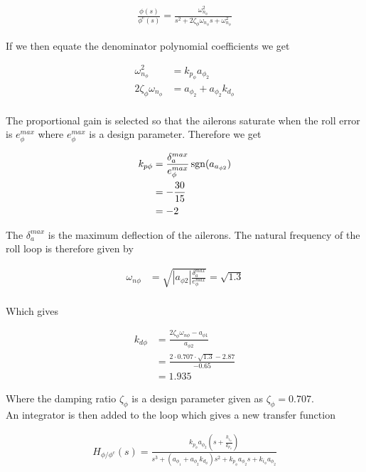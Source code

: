 \begin{align}
    \frac{\phi(s)}{\phi^c(s)} = \frac{\omega^2_{n_\phi}}{s^2+2\zeta_\phi \omega_{n_\phi}s+\omega^2_{n_\phi}}
\end{align}

If we then equate the denominator polynomial coefficients we get

\begin{align}
    \omega^2_{n_\phi} &= k_{p_\phi}a_{\phi_2} \\
    2\zeta_\phi \omega_{n_\phi} &= a_{\phi_2} + a_{\phi_2}k_{d_\phi} \\
\end{align}

The proportional gain is selected so that the ailerons saturate when the roll error is $e^{max}_\phi$ where $e^{max}_\phi$ is a design parameter. Therefore we get 

\begin{align}
   k_{p\phi} &= \frac{\delta_a^{max}}{e_{\phi}^{max}}\operatorname{sgn}(a_{a_{\phi2}}) \\
   &= -\frac{30}{15} \\
   &= -2
\end{align}

The $\delta_a^{max}$ is the maximum deflection of the ailerons. The natural frequency of the roll loop is therefore given by

\begin{align}
    \omega_{n\phi} &= \sqrt{|a_{\phi2}|\frac{\delta_a^{max}}{e_{\phi}^{max}}} = \sqrt{1.3} \\
\end{align}

Which gives

\begin{align}
    k_{d\phi} &= \frac{2\zeta_{\phi}\omega_{n\phi}-a_{\phi1}}{a_{\phi2}} \\
    &= \frac{2\cdot 0.707 \cdot \sqrt{1.3} - 2.87}{-0.65} \\
    &= 1.935
\end{align}

Where the damping ratio $\zeta_{\phi}$ is a design parameter given as $\zeta_{\phi}= 0.707$. \\

An integrator is then added to the loop which gives a new transfer function 

\begin{align}
    H_{\phi/\phi^c}(s) = \frac{k_{p_\phi}a_{\phi_2}\left( s + \frac{k_{i_\phi}}{k_{p_\phi}}\right)}{s^3 + (a_{\phi_1} + a_{\phi_2}k_{d_\phi})s^2 + k_{p_\phi}a_{\phi_2}s + k_{i_\phi}a_{\phi_2} }
\end{align}

